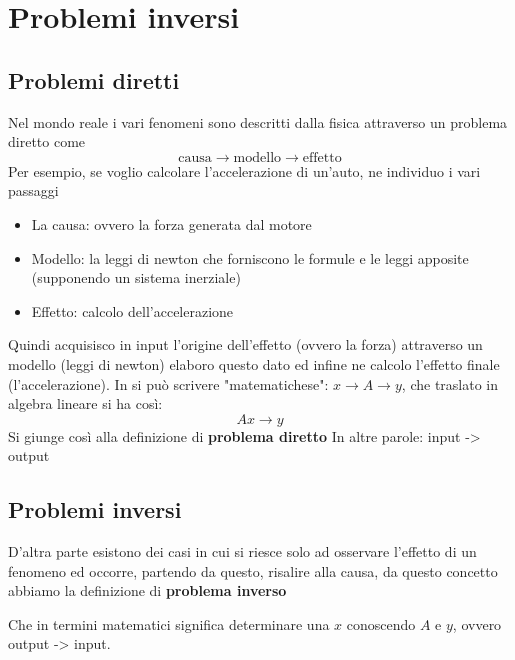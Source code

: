 \chapter{Problemi inversi}

\section{Problemi diretti}
Nel mondo reale i vari fenomeni sono descritti dalla fisica attraverso un problema diretto come 
\[
    \text{causa} \to \text{modello} \to \text{effetto}     
\]
Per esempio, se voglio calcolare l'accelerazione di un'auto, ne individuo i vari passaggi
\begin{itemize}
    \item La causa: ovvero la forza generata dal motore
    \item Modello: la leggi di newton che forniscono le formule e le leggi apposite (supponendo un sistema inerziale)
    \item Effetto: calcolo dell'accelerazione
\end{itemize}

Quindi acquisisco in input l'origine dell'effetto (ovvero la forza) attraverso un modello (leggi di newton) elaboro questo dato ed infine ne calcolo l'effetto finale (l'accelerazione). In si può scrivere "matematichese": $x \to A \to y$, che traslato in algebra lineare si ha così:
\[
    Ax \to y    
\]
Si giunge così alla definizione di \textbf{problema diretto}
In altre parole: input -> output

\section{Problemi inversi}

D'altra parte esistono dei casi in cui si riesce solo ad osservare l'effetto di un fenomeno ed occorre, partendo da questo, risalire alla causa, da questo concetto abbiamo la definizione di \textbf{problema inverso}


Che in termini matematici significa determinare una $x$ conoscendo $A$ e $y$, ovvero output -> input.

